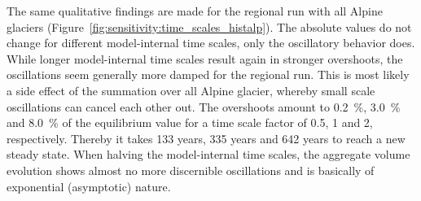       The same qualitative findings are made for the regional run with all Alpine glaciers (Figure~\ref{fig:sensitivity:time_scales_histalp}). The absolute values do not change for different model-internal time scales, only the oscillatory behavior does. While longer model-internal time scales result again in stronger overshoots, the oscillations seem generally more damped for the regional run. This is most likely a side effect of the summation over all Alpine glacier, whereby small scale oscillations can cancel each other out. The overshoots amount to \SI{0.2}{\percent}, \SI{3.0}{\percent} and \SI{8.0}{\percent} of the equilibrium value for a time scale factor of 0.5, 1 and 2, respectively. Thereby it takes 133 years, 335 years and 642 years to reach a new steady state. When halving the model-internal time scales, the aggregate volume evolution shows almost no more discernible oscillations and is basically of exponential (asymptotic) nature.


